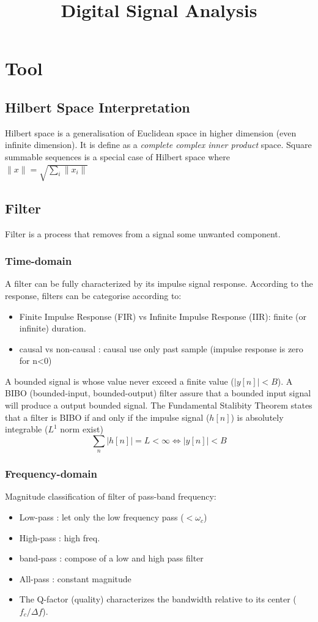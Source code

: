\documentclass[twocolumn]{article}
\title{Digital Signal Analysis}
\date{\vspace{-6ex}}
\numberwithin{equation}{section}
\begin{document}
\maketitle


\newpage
\section{Tool}
	\subsection{Hilbert Space Interpretation}
Hilbert space is a generalisation of Euclidean space in higher dimension (even infinite dimension). It is define as a \textit{complete complex inner product} space. 
Square summable sequences is a special case of Hilbert space where $\|x\|=\sqrt{\sum_i \|x_i\|}$

	\subsection{Filter}
Filter is a process that removes from a signal some unwanted component. 

		\subsubsection{Time-domain}
A filter can be fully characterized by its impulse signal response. According to the response, filters can be categorise according to:
\begin{itemize}
	\item Finite Impulse Response (FIR) vs Infinite Impulse Response (IIR): finite (or infinite) duration.
	\item causal vs non-causal : causal use only past sample (impulse response is zero for n<0)
\end{itemize}

A bounded signal is whose value never exceed a finite value ($|y[n]|<B$). A BIBO (bounded-input, bounded-output) filter assure that a bounded input signal will produce a output bounded signal. The Fundamental Stalibity Theorem states that a filter is BIBO if and only if the impulse signal ($h[n]$) is absolutely integrable ($L^1$ norm exist)
$$ \sum_n|h[n]|=L<\infty \Leftrightarrow |y[n]|<B$$

		\subsubsection{Frequency-domain}
Magnitude classification of filter of pass-band frequency:
\begin{itemize}
	\item Low-pass : let only the low frequency pass ($<\omega_c$)
	\item High-pass : high freq.
	\item band-pass : compose of a low and high pass filter
	\item All-pass : constant magnitude 
	\item The Q-factor (quality) characterizes the bandwidth relative to its center ($f_c/\Delta f$).
\end{itemize}
\end{document}
